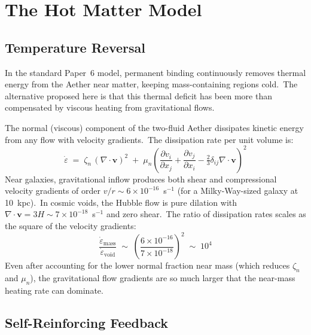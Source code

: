 \documentclass[12pt,letterpaper]{article}
\begin{document}
\section{The Hot Matter Model}
\label{sec:hot-matter}

\subsection{Temperature Reversal}

In the standard Paper~6 model, permanent binding continuously removes thermal
energy from the Aether near matter, keeping mass-containing regions cold.\
The alternative proposed here is that this thermal deficit has been more than
compensated by viscous heating from gravitational flows.

The normal (viscous) component of the two-fluid Aether dissipates kinetic
energy from any flow with velocity gradients.\ The dissipation rate per unit
volume is:
%
\begin{equation}
  \dot\varepsilon \;=\; \zeta_n\,(\nabla \cdot \mathbf{v})^2
    \;+\; \mu_n\left(\frac{\partial v_i}{\partial x_j}
    + \frac{\partial v_j}{\partial x_i}
    - \tfrac{2}{3}\delta_{ij}\nabla \cdot \mathbf{v}\right)^2
  \label{eq:dissipation-general}
\end{equation}
%
Near galaxies, gravitational inflow produces both shear and compressional
velocity gradients of order $v/r \sim 6 \times 10^{-16}$~s$^{-1}$ (for a
Milky-Way-sized galaxy at 10~kpc).\ In cosmic voids, the Hubble flow is
pure dilation with $\nabla \cdot \mathbf{v} = 3H \sim 7 \times 10^{-18}$~s$^{-1}$
and zero shear.\ The ratio of dissipation rates scales as the square of the
velocity gradients:
%
\begin{equation}
  \frac{\dot\varepsilon_{\mathrm{mass}}}{\dot\varepsilon_{\mathrm{void}}}
    \;\sim\; \left(\frac{6 \times 10^{-16}}{7 \times 10^{-18}}\right)^2
    \;\sim\; 10^4
  \label{eq:heating-ratio}
\end{equation}
%
Even after accounting for the lower normal fraction near mass (which reduces
$\zeta_n$ and $\mu_n$), the gravitational flow gradients are so much larger
that the near-mass heating rate can dominate.


\subsection{Self-Reinforcing Feedback}
\end{document}
